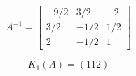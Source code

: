 \[
A^{-1}=\left[
\begin{array}{ccc}
-9/2 & 3/2 & -2 \\
3/2 & -1/2 & 1/2\\
2 & -1/2 & 1
\end{array}\right]
\]
\bigskip

\[
  K_1(A)= \left(112
  \right)
\]
